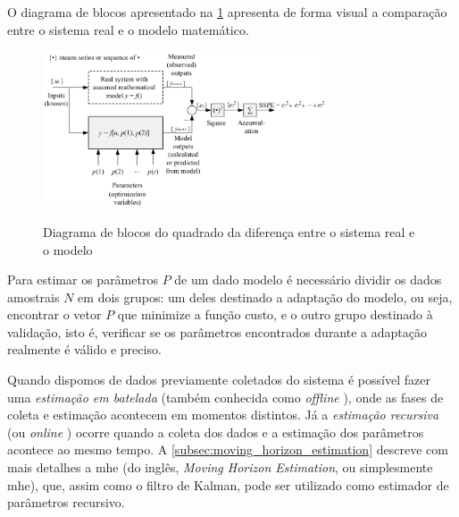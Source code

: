 O diagrama de blocos apresentado na \cref{fig:parameter_estimation} apresenta de forma
visual a comparação entre o sistema real e o modelo matemático.

\begin{figure}[h]
	\caption{Diagrama de blocos do quadrado da diferença entre o sistema real e o modelo}
	\begin{center}
		\includegraphics[width=0.75\textwidth]{./5_images/fig_parameter_estimation.png} 
		\label{fig:parameter_estimation}
	\end{center}
	\centering
\end{figure}

Para estimar os parâmetros $P$ de um dado modelo é necessário dividir os dados amostrais
$N$ em dois grupos: um deles destinado a adaptação do modelo, ou seja, encontrar o vetor $P$
que minimize a função custo, e o outro grupo destinado à validação, isto é, verificar se os
parâmetros encontrados durante a adaptação realmente é válido e preciso.

Quando dispomos de dados previamente coletados do sistema é possível fazer uma \textit{estimação
em batelada} (também conhecida como \textit{offline} \cite{Bolognani2009}), onde as fases de coleta e
estimação acontecem em momentos distintos. Já a \textit{estimação recursiva} (ou \textit{online}
\cite{Stadler2011}) ocorre quando a coleta dos dados e a estimação dos parâmetros acontece ao mesmo tempo.
A \cref{subsec:moving_horizon_estimation} descreve com mais detalhes a
\acrlong{mhe} (do inglês, \textit{Moving Horizon Estimation}, ou simplesmente \acrshort{mhe}), que,
assim como o filtro de Kalman, pode ser utilizado como estimador de parâmetros recursivo.


